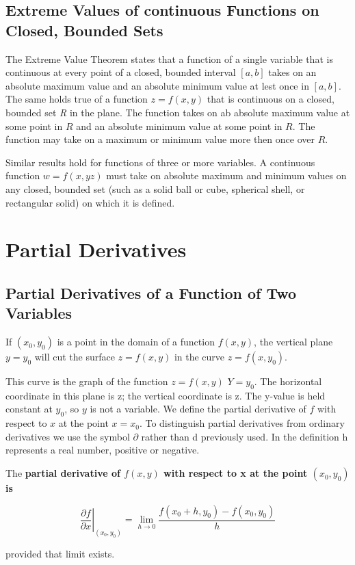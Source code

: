 \documentclass[12pt,a4paper]{article}
\newenvironment{definition}{\begin{definitionbox}}{\end{definitionbox}\vspace{1\baselineskip}}
\begin{document}
\subsection{Extreme Values of continuous Functions on Closed, Bounded Sets}

The Extreme Value Theorem states that a function of a single variable that is continuous at every point of a closed, bounded interval \([a,b]\) takes on an absolute maximum value and an absolute minimum value at lest once  in \([a,b]\). The same holds true of a function \(z = f(x,y)\) that is continuous on a closed, bounded set \textit{R} in the plane. The function takes on ab absolute maximum value at some point in \(R\) and an absolute minimum value at some point in \(R\).
The function may take on a maximum or minimum value more then once over \(R\). 

Similar results hold for functions of three or more variables. A continuous function \(w = f(x,yz)\) must take on absolute maximum and minimum values on any closed, bounded set (such as a solid ball or cube, spherical shell, or rectangular solid) on which it is defined.

\section{Partial Derivatives}

\subsection{Partial Derivatives of a Function of Two Variables}

If \((x_0,y_0)\) is a point in the domain of a function \(f(x,y)\), the vertical plane \(y=y_0\) will cut the surface \(z = f(x,y)\) in the curve \(z = f(x,y_0)\).
 
This curve is the graph of the function \(z = f(x,y)\) \(Y = y_0\). The horizontal coordinate in this plane is z; the vertical coordinate is z. The y-value is held constant at \(y_0\), so \(y\) is not a variable.
We define the partial derivative of \(f\) with respect to \(x\) at the point \(x = x_0\). To distinguish partial derivatives from ordinary derivatives we use the symbol \(\partial\) rather than d previously used. In the definition h represents a real number, positive or negative.

\begin{definition}
    The \textbf{partial derivative of \(f(x,y)\) with respect to x at the point \((x_0,y_0)\) is}

    \[\left. \frac{\partial f}{\partial x} \right|_{(x_0, y_0)} = \lim_{h \to 0}\frac{f(x_0+h,y_0)-f(x_0,y_0)}{h}\]

    provided that limit exists.


\end{definition}
\end{document}
